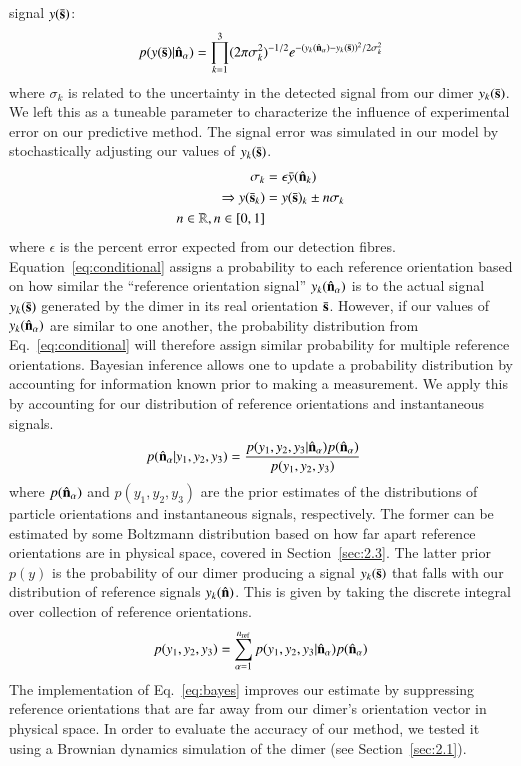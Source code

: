 \documentclass[final, 3p]{elsarticle}
\begin{document}
signal $y(\bar{\bf s})$:
\begin{align}
\label{eq:conditional}
  p(y(\bar{\bf s})|\hat{\bf n}_\alpha)
  = \prod^3_{k=1}
(2\pi\sigma_k^2)^{-1/2} 
e^{-(y_{k}(\hat{\bf n}_\alpha)-y_{k}(\bar{\bf s}))^2/2\sigma_k^2}
\end{align}
where $\sigma_k$ is related to the uncertainty in the detected signal
from our dimer $y_k(\bar{\bf s})$.  We left this as a tuneable
parameter to characterize the influence of experimental error on our
predictive method.  The signal error was simulated in our model by
stochastically adjusting our values of $y_k(\bar{\bf s})$.
\begin{eqnarray*}
  \sigma_k
  &= \epsilon\bar{y}(\hat{\bf n}_k)
  \\
  \Rightarrow y(\bar{\bf s}_k) &= y(\bar{\bf s})_k \pm n\sigma_k
  \\ 
n \in \mathbb{R}, n\in[0,1]
\end{eqnarray*} 
where $\epsilon$ is the percent error expected from our detection
fibres.  Equation~\eqref{eq:conditional} assigns a probability to each
reference orientation based on how similar the ``reference orientation
signal'' $y_{k}(\hat{\bf n}_\alpha)$ is to the actual signal
$y_{k}(\bar{\bf s})$ generated by the dimer in its real orientation
$\bar{\bf s}$.  However, if our values of $y_k(\hat{\bf n}_\alpha)$
are similar to one another, the probability distribution from
Eq.~\eqref{eq:conditional} will therefore assign similar probability
for multiple reference orientations. Bayesian inference allows one to
update a probability distribution by accounting for information known
prior to making a measurement.  We apply this by accounting for our
distribution of reference orientations and instantaneous signals.
\begin{align}
  \label{eq:bayes}
  p(\hat{\bf n}_\alpha| y_1,y_2,y_3)
  &=
    \frac{p(y_1,y_2,y_3|\hat{\bf n}_\alpha)
    p(\hat{\bf n}_\alpha)}{p(y_1, y_2, y_3)}
\end{align}
where $p(\hat{\bf n}_\alpha)$ and $p(y_1, y_2, y_3)$ are the prior
estimates of the distributions of particle orientations and
instantaneous signals, respectively.  The former can be estimated by
some Boltzmann distribution based on how far apart reference
orientations are in physical space, covered in Section~\ref{sec:2.3}.
The latter prior $p(y)$ is the probability of our dimer producing a
signal $y_k(\bar{\bf s})$ that falls with our distribution of
reference signals $y_k(\hat{\bf n})$.  This is given by taking the
discrete integral over collection of reference orientations.
\begin{align}
  p(y_1, y_2, y_3)
  =
  \sum_{\alpha=1}^{n_{\rm ref}}
  p(y_1, y_2, y_3|\hat{\bf n}_\alpha)
  p(\hat{\bf n}_\alpha)
\end{align}
The implementation of Eq.~\eqref{eq:bayes} improves our estimate by
suppressing reference orientations that are far away from our dimer's
orientation vector in physical space.  In order to evaluate the
accuracy of our method, we tested it using a Brownian dynamics
simulation of the dimer (see Section~\ref{sec:2.1}).
\end{document}
